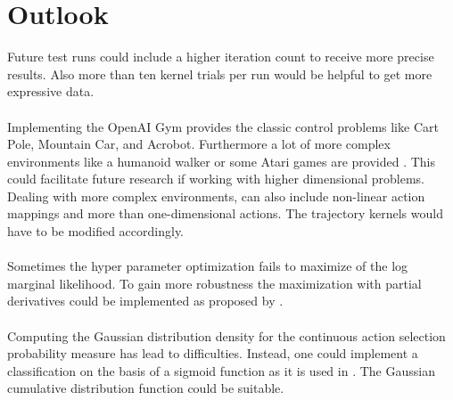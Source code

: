 \chapter{Outlook}
\label{chap:7}

Future test runs could include a higher iteration count to receive more precise results. Also more than ten kernel trials per run would be helpful to get more expressive data.\\
\\
Implementing the OpenAI Gym provides the classic control problems like Cart Pole, Mountain Car, and Acrobot. Furthermore a lot of more complex environments like a humanoid walker or some Atari games are provided \cite{DBLP:journals/corr/BrockmanCPSSTZ16}. This could facilitate future research if working with higher dimensional problems.\\
Dealing with more complex environments, can also include non-linear action mappings and more than one-dimensional actions. The trajectory kernels would have to be modified accordingly.\\
\\
Sometimes the hyper parameter optimization fails to maximize of the log marginal likelihood. To gain more robustness the maximization with partial derivatives could be implemented as proposed by \cite{rasmussen2006gaussian, lizotte2008practical}.\\
\\
Computing the Gaussian distribution density for the continuous action selection probability measure has lead to difficulties. Instead, one could implement a classification on the basis of a sigmoid function as it is used in \cite{rasmussen2006gaussian}. The Gaussian cumulative distribution function could be suitable.\\
\\
